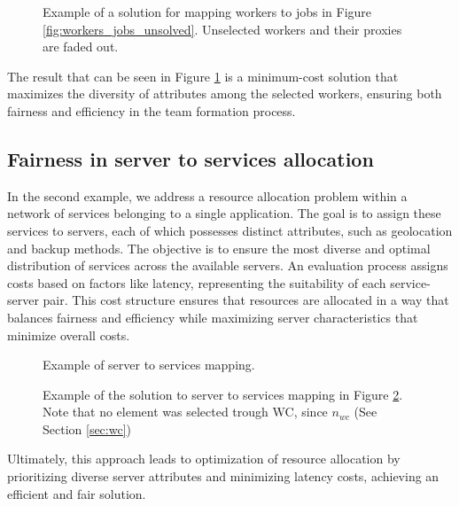         \begin{figure}[!ht]
            \centering
            
            \caption{Example of a solution for mapping workers to jobs in Figure \ref{fig:workers_jobs_unsolved}. Unselected workers and their proxies are faded out.}
            \label{fig:workers_jobs_solved}
        \end{figure}
        
         
        The result that can be seen in Figure {\ref{fig:workers_jobs_solved}} is a minimum-cost solution that maximizes the diversity of attributes among the selected workers, ensuring both fairness and efficiency in the team formation process. 
        
        \subsection{Fairness in server to services allocation}
        
        In the second example, we address a resource allocation problem within a network of services belonging to a single application. The goal is to assign these services to servers, each of which possesses distinct attributes, such as geolocation and backup methods. The objective is to ensure the most diverse and optimal distribution of services across the available servers. An evaluation process assigns costs based on factors like latency, representing the suitability of each service-server pair. This cost structure ensures that resources are allocated in a way that balances fairness and efficiency while maximizing server characteristics that minimize overall costs.
        
        \begin{figure}[!ht]
            \centering
            
            \caption{Example of server to services mapping.}
            \label{fig:server_services_unsolved}
        \end{figure}
        
        \begin{figure}[!ht]
            \centering
            
            \caption{Example of the solution to server to services mapping in Figure \ref{fig:server_services_unsolved}. Note that no element was selected trough WC, since $n_{wc}$ (See Section \ref{sec:wc})}
            \label{fig:server_services_solved}
        \end{figure}
        
        Ultimately, this approach leads to optimization of resource allocation by prioritizing diverse server attributes and minimizing latency costs, achieving an efficient and fair solution.

